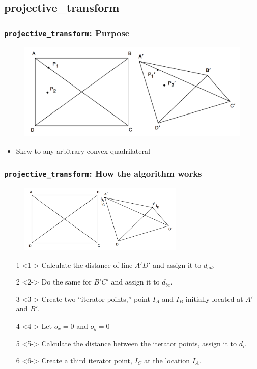 \documentclass{beamer}
\begin{document}
\subsection{projective\_transform}
\begin{frame}
	\frametitle{{\tt projective\_transform}: Purpose}
	\begin{figure}
		\centering
		\includegraphics[width=\textwidth]{../proposal/arbiskew_graphic.png}
	\end{figure}
	\begin{itemize}
		\item Skew to any arbitrary convex quadrilateral
	\end{itemize}
\end{frame}

\begin{frame}
	\frametitle{{\tt projective\_transform}: How the algorithm works}
	\begin{figure}
		\centering
		\includegraphics[width=0.7\textwidth]{images/arbiskew_graphic_with_iterators0.png}
	\end{figure}
	\begin{enumerate}
		\item[1]<1-> Calculate the distance of line $\overline{A\prime D\prime}$ and assign it to $d_{ad}$.
		\item[2]<2-> Do the same for $\overline{B\prime C\prime}$ and assign it to $d_{bc}$.
		\item[3]<3-> Create two ``iterator points,'' point $I_A$ and $I_B$ initially located at $A\prime$ and $B\prime$.
		\item[4]<4-> Let $o_x = 0$ and $o_y = 0$
		\item[5]<5-> Calculate the distance between the iterator points, assign it to $d_i$.
		\item[6]<6-> Create a third iterator point, $I_C$ at the location $I_A$.
	\end{enumerate}
\end{frame}
\end{document}
